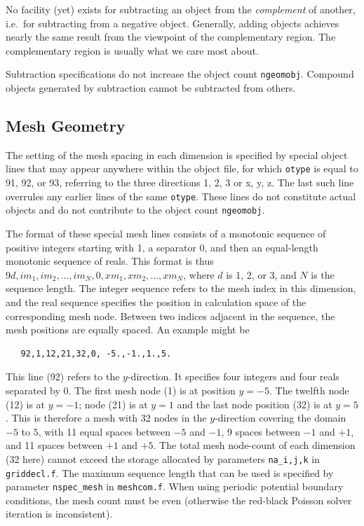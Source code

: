 \documentclass[12pt]{article}
\begin{document}
No facility (yet) exists for subtracting an object from the
\emph{complement} of another, i.e.\ for subtracting from a negative
object. Generally, adding objects achieves nearly the same result from
the viewpoint of the complementary region. The complementary region is
usually what we care most about.

Subtraction specifications do not increase the object count
\verb!ngeomobj!. Compound objects generated by subtraction cannot be
subtracted from others.

\subsection{Mesh Geometry}

The setting of the mesh spacing in each dimension is specified by
special object lines that may appear anywhere within the object file,
for which \verb!otype! is equal to 91, 92, or 93, referring to the
three directions 1, 2, 3 or x, y, z. The last such line overrules any
earlier lines of the same \verb!otype!. These lines do not constitute
actual objects and do not contribute to the object count
\verb!ngeomobj!.

The format of these special mesh lines consists of a monotonic
sequence of positive integers starting with 1, a separator 0, and then
an equal-length monotonic sequence of reals. This format is thus
$9d,im_1,im_2,...,im_N,0,xm_1,xm_2,...,xm_N$, where $d$ is 1, 2, or 3,
and $N$ is the sequence length. The integer sequence refers to the
mesh index in this dimension, and the real sequence specifies the
position in calculation space of the corresponding mesh node. Between
two indices adjacent in the sequence, the mesh positions are equally
spaced. An example might be
\begin{verbatim}
   92,1,12,21,32,0, -5.,-1.,1.,5.
\end{verbatim}
This line (92) refers to the $y$-direction. It specifies four integers
and four reals separated by 0. The first mesh node (1) is at position
$y=-5$. The twelfth node (12) is at $y=-1$; node (21) is at $y=1$ and the
last node position (32) is at $y=5$. This is therefore a mesh with 32
nodes in the $y$-direction covering the domain $-5$ to $5$, with 11
equal spaces between $-5$ and $-1$, 9 spaces between $-1$ and $+1$,
and 11 spaces between $+1$ and $+5$. The total mesh node-count of each
dimension (32 here) cannot exceed the storage allocated by parameters
\verb!na_i,j,k! in \verb!griddecl.f!. The maximum sequence length that
can be used is specified by parameter \verb!nspec_mesh! in
\verb!meshcom.f!. When using periodic potential boundary conditions, 
the mesh count must be even (otherwise the red-black Poisson solver
iteration is inconsistent).
\end{document}
